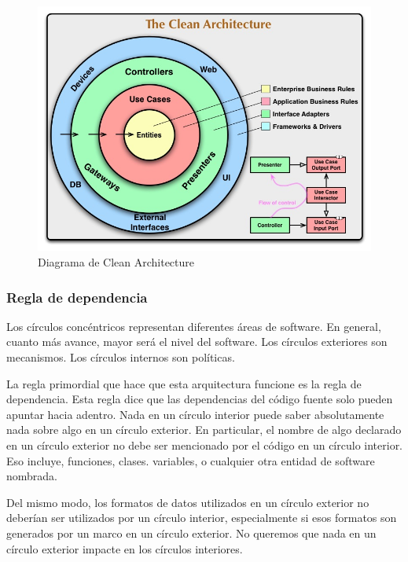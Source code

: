 \begin{figure}[!h]
	\centering
	\includegraphics[width = 14cm]{MainMatter/CleanArchitecture.jpg}
	\caption{Diagrama de Clean Architecture }
	\label{fig:clean_architecture}
	
\end{figure}	

\subsubsection{Regla de dependencia}
  
  Los círculos concéntricos representan diferentes áreas de software. En general, cuanto más avance, mayor será el nivel del software. Los círculos exteriores son mecanismos. Los círculos internos son políticas.
  
La regla primordial que hace que esta arquitectura funcione es la regla de dependencia. Esta regla dice que las dependencias del código fuente solo pueden apuntar hacia adentro. Nada en un círculo interior puede saber absolutamente nada sobre algo en un círculo exterior. En particular, el nombre de algo declarado en un círculo exterior no debe ser mencionado por el código en un círculo interior. Eso incluye, funciones, clases. variables, o cualquier otra entidad de software nombrada.


Del mismo modo, los formatos de datos utilizados en un círculo exterior no deberían ser utilizados por un círculo interior, especialmente si esos formatos son generados por un marco en un círculo exterior. No queremos que nada en un círculo exterior impacte en los círculos interiores. 



